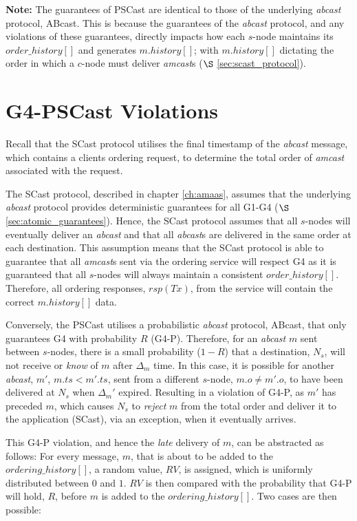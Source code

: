 \textbf{Note:} The guarantees of \textsf{PSCast} are identical to those of the underlying \emph{abcast} protocol, \textsf{ABcast}.  This is because the guarantees of the \emph{abcast} protocol, and any violations of these guarantees, directly impacts how each $s$-node maintains its $order\_history[]$ and generates $m.history[]$; with $m.history[]$ dictating the order in which a $c$-node must deliver \emph{amcast}s ($\S$ \ref{sec:scast_protocol}).  

\section{G4-PSCast Violations}
Recall that the \textsf{SCast} protocol utilises the final timestamp of the \emph{abcast} message, which contains a clients ordering request, to determine the total order of \emph{amcast} associated with the request.  

The \textsf{SCast} protocol, described in chapter \ref{ch:amaas}, assumes that the underlying \emph{abcast} protocol provides deterministic guarantees for all G1-G4 ($\S$ \ref{sec:atomic_guarantees}).  Hence, the \textsf{SCast} protocol assumes that all $s$-nodes will eventually deliver an \emph{abcast} and that all \emph{abcast}s are delivered in the same order at each destination.  This assumption means that the \textsf{SCast} protocol is able to guarantee that all \emph{amcast}s sent via the ordering service will respect G4 as it is guaranteed that all $s$-nodes will always maintain a consistent $order\_history[]$.  Therefore, all ordering responses, $rsp(Tx)$, from the service will contain the correct $m.history[]$ data.  

Conversely, the \textsf{PSCast} utilises a probabilistic \emph{abcast} protocol, \textsf{ABcast}, that only guarantees G4 with probability $R$ (G4-P).  Therefore, for an \emph{abcast} $m$ sent between $s$-nodes, there is a small probability ($1-R$) that a destination, $N_s$, will not receive or \emph{know} of $m$ after $\Delta_m$ time.  In this case, it is possible for another \emph{abcast}, $m'$, $m.ts < m'.ts$, sent from a different $s$-node, $m.o \neq m'.o$, to have been delivered at $N_s$ when $\Delta_m'$ expired.  Resulting in a violation of G4-P, as $m'$ has preceded $m$, which causes $N_s$ to \emph{reject} $m$ from the total order and deliver it to the application (\textsf{SCast}), via an exception, when it eventually arrives.  

This G4-P violation, and hence the \emph{late} delivery of $m$, can be abstracted as follows: For every message, $m$, that is about to be added to the $ordering\_history[]$, a random value, $RV$, is assigned, which is uniformly distributed between $0$ and $1$.  $RV$ is then compared with the probability that G4-P will hold, $R$, before $m$ is added to the $ordering\_history[]$. Two cases are then possible:

